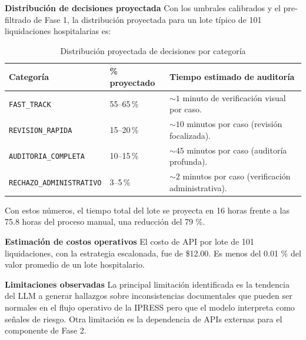 \textbf{Distribución de decisiones proyectada} Con los umbrales calibrados y el pre-filtrado de Fase 1, la distribución proyectada para un lote típico de 101 liquidaciones hospitalarias es:

\begin{table}[H]
    \centering
    \caption{Distribución proyectada de decisiones por categoría}
    \label{tab:distribucion-proyectada-decisiones}

    \footnotesize
    \setlength{\tabcolsep}{7pt}
    \renewcommand{\arraystretch}{1.25}

    \begin{tabular}{
        p{}
        p{}
        p{}
    }
        \toprule
        \textbf{Categoría}
        & \textbf{\% proyectado}
        & \textbf{Tiempo estimado de auditoría} \\
        \midrule

        \texttt{FAST\_TRACK}
        & 55--65\,\%
        & $\sim 1$ minuto de verificación visual por caso. \\

        \texttt{REVISION\_RAPIDA}
        & 15--20\,\%
        & $\sim 10$ minutos por caso (revisión focalizada). \\

        \texttt{AUDITORIA\_COMPLETA}
        & 10--15\,\%
        & $\sim 45$ minutos por caso (auditoría profunda). \\

        \texttt{RECHAZO\_ADMINISTRATIVO}
        & 3--5\,\%
        & $\sim 2$ minutos por caso (verificación administrativa). \\

        \bottomrule
    \end{tabular}
\end{table}
Con estos números, el tiempo total del lote se proyecta en 16 horas frente a las 75.8 horas del proceso manual, una reducción del 79 \%.

\textbf{Estimación de costos operativos} El costo de API por lote de 101 liquidaciones, con la estrategia escalonada, fue de \$12.00. Es menos del 0.01 \% del valor promedio de un lote hospitalario.

\textbf{Limitaciones observadas} La principal limitación identificada es la tendencia del LLM a generar hallazgos sobre inconsistencias documentales que pueden ser normales en el flujo operativo de la IPRESS pero que el modelo interpreta como señales de riesgo. Otra limitación es la dependencia de APIs externas para el componente de Fase 2.
